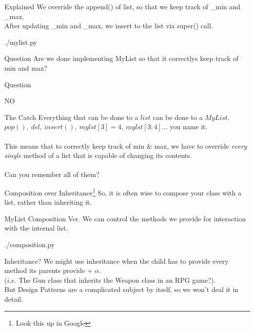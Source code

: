 \documentclass{beamer}
\begin{document}
\begin{frame}{Explained}
  We override the append() of list, so that we keep track of \_min and \_max.\\
  After updating \_min and \_max, we insert to the list via super() call.
  \begin{lstinputlisting}[firstline=12, lastline=17]
    {./mylist.py}
  \end{lstinputlisting}
\end{frame}

\begin{frame}{Question}
  Are we done implementing MyList so that it correctlys keep track of min and max?
\end{frame}

\begin{frame}{Question}
  \begin{center}
    NO
  \end{center}
\end{frame}

\begin{frame}{The Catch}
  Everything that can be done to a $list$ can be done to a $MyList$.\\
  $pop(),\ del,\ insert(),\ mylst[3]=4,\ mylst[3:4]$... you name it.\\
  \mbox{}\\
  This means that to correctly keep track of min \& max, we have to override
  \textit{every single} method of a list that is capable of changing its
  contents.\\
  \mbox{}\\
  Can you remember all of them?
\end{frame}

\begin{frame}{Composition over Inheritance\footnote{Look this up in Google}}
    So, it is often wise to compose your class with a list, rather than inheriting
    it.
\end{frame}

\begin{frame}{MyList Composition Ver.}
  We can control the methods we provide for interaction with the internal list.
  \begin{lstinputlisting}[firstline=1, lastline=23]
    {./composition.py}
  \end{lstinputlisting}
\end{frame}

\begin{frame}{Inheritance?}
  We might use inheritance when the child has to provide every method its parents
  provide + $\alpha$. \\($i.e.$ The Gun class that inherits the Weapon class in an RPG
  game?). \\But Design Patterns are a complicated subject by itself, so we won't
  deal it in detail.
\end{frame}
\end{document}
